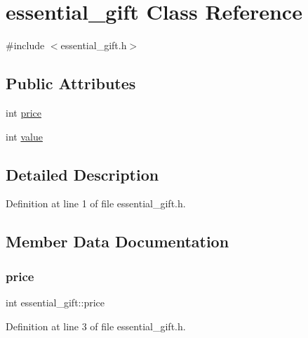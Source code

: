 \hypertarget{classessential__gift}{}\section{essential\+\_\+gift Class Reference}
\label{classessential__gift}


{\ttfamily \#include $<$essential\+\_\+gift.\+h$>$}

\subsection*{Public Attributes}
\begin{DoxyCompactItemize}
\item 
int \hyperlink{classessential__gift_aec674fbf33c98970383537f008b7fa48}{price}
\item 
int \hyperlink{classessential__gift_a3d63da7ce4ba7d330faa7d5f62b38096}{value}
\end{DoxyCompactItemize}


\subsection{Detailed Description}


Definition at line 1 of file essential\+\_\+gift.\+h.



\subsection{Member Data Documentation}
\mbox{\label{classessential__gift_aec674fbf33c98970383537f008b7fa48}} 
\subsubsection{\texorpdfstring{price}{price}}
{\footnotesize\ttfamily int essential\+\_\+gift\+::price}



Definition at line 3 of file essential\+\_\+gift.\+h.

\mbox{\label{classessential__gift_a3d63da7ce4ba7d330faa7d5f62b38096}} 
